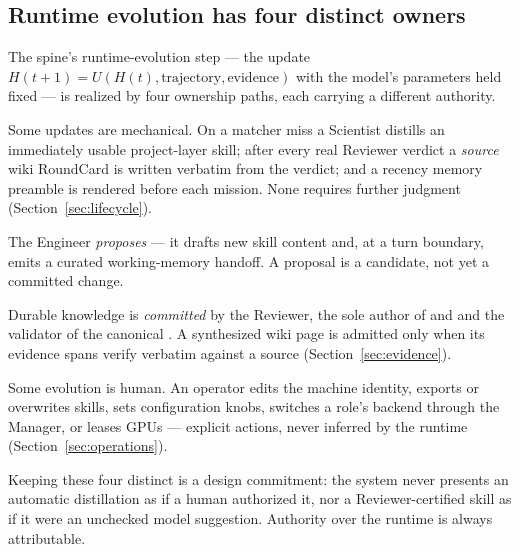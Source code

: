 \subsection{Runtime evolution has four distinct owners}

The spine's runtime-evolution step --- the update
$H(t{+}1)=U(H(t),\text{trajectory},\text{evidence})$ with the model's parameters
held fixed --- is realized by four ownership paths, each carrying a different
authority.

\begin{description}[leftmargin=1.4em, style=nextline]
  \item[Automatic.] Some updates are mechanical. On a matcher miss a Scientist
    distills an immediately usable project-layer skill; after every real Reviewer
    verdict a \emph{source} wiki RoundCard is written verbatim from the verdict; and
    a recency memory preamble is rendered before each mission. None requires further
    judgment (Section~\ref{sec:lifecycle}).
  \item[Model-proposed.] The Engineer \emph{proposes} --- it drafts new skill
    content and, at a turn boundary, emits a curated working-memory handoff. A
    proposal is a candidate, not yet a committed change.
  \item[Reviewer-authored.] Durable knowledge is \emph{committed} by the Reviewer,
    the sole author of  and  and the validator of
    the canonical . A synthesized wiki page is admitted only
    when its evidence spans verify verbatim against a source
    (Section~\ref{sec:evidence}).
  \item[Operator-invoked.] Some evolution is human. An operator edits the machine
    identity, exports or overwrites skills, sets configuration knobs, switches a
    role's backend through the Manager, or leases GPUs --- explicit actions, never
    inferred by the runtime (Section~\ref{sec:operations}).
\end{description}

Keeping these four distinct is a design commitment: the system never presents an
automatic distillation as if a human authorized it, nor a Reviewer-certified skill
as if it were an unchecked model suggestion. Authority over the runtime is always
attributable.
